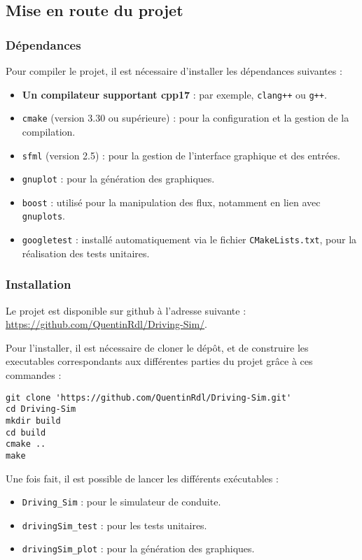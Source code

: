 \subsection{Mise en route du projet}\label{subsec:mise-en-route-du-projet}

\subsubsection{Dépendances}\label{subsubsec:dependances}
Pour compiler le projet, il est nécessaire d'installer les dépendances suivantes :
\begin{itemize}
    \item \textbf{Un compilateur supportant \gls{cpp}17} : par exemple, \texttt{clang++} ou \texttt{g++}.
    \item \texttt{\gls{cmake}} (version 3.30 ou supérieure) : pour la configuration et la gestion de la compilation.
    \item \texttt{\gls{sfml}} (version 2.5) : pour la gestion de l'interface graphique et des entrées.
    \item \texttt{\gls{gnuplot}} : pour la génération des graphiques.
    \item \texttt{\gls{boost}} : utilisé pour la manipulation des flux, notamment en lien avec \texttt{\glspl{gnuplot}}.
    \item \texttt{\gls{googletest}} : installé automatiquement via le fichier \texttt{CMakeLists.txt}, pour la réalisation des tests unitaires.
\end{itemize}

\subsubsection{Installation}\label{subsubsec:installation}
Le projet est disponible sur \gls{github} à l'adresse suivante : \url{https://github.com/QuentinRdl/Driving-Sim/}.

Pour l'installer, il est nécessaire de cloner le dépôt, et de construire les executables correspondants aux différentes parties du projet grâce à ces commandes :

\begin{lstlisting}[style=bashStyle,label={lst:build}]
git clone 'https://github.com/QuentinRdl/Driving-Sim.git'
cd Driving-Sim
mkdir build
cd build
cmake ..
make
\end{lstlisting}

Une fois fait, il est possible de lancer les différents exécutables :
\begin{itemize}
    \item \texttt{Driving\_Sim} : pour le simulateur de conduite.
    \item \texttt{drivingSim\_test} : pour les tests unitaires.
    \item \texttt{drivingSim\_plot} : pour la génération des graphiques.
\end{itemize}

